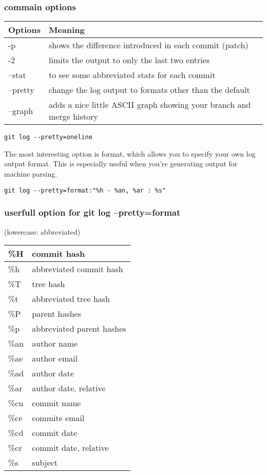 \documentclass[11pt]{article}
\begin{document}
\subsubsection{commain options}
\label{sec:org9db2588}
\begin{center}
\begin{tabular}{ll}
Options & Meaning\\
\hline
-p & shows the difference introduced in each commit (patch)\\
-2 & limits the output to only the last two entries\\
--stat & to see some abbreviated stats for each commit\\
--pretty & change the log output to formats other than the default\\
--graph & adds a nice little ASCII graph showing your branch and merge history\\
\end{tabular}
\end{center}

\begin{verbatim}
git log --pretty=oneline
\end{verbatim}


The most interesting option is format, which allows you to specify your own log output format. This is especially useful when you're generating output for machine parsing.\\
\begin{verbatim}
git log --pretty=format:"%h - %an, %ar : %s"
\end{verbatim}


\subsubsection{userfull option for git log --pretty=format}
\label{sec:orgaacbc63}
(lowercase: abbreviated)\\
\begin{center}
\begin{tabular}{|l|l|}
\hline
\%H & commit hash \\
\hline
\%h & abbreviated commit hash \\
\hline
\%T & tree hash \\
\hline
\%t & abbreviated tree hash \\
\hline
\%P & parent hashes \\
\hline
\%p & abbreviated parent hashes \\
\hline
\%an & author name \\
\hline
\%ae & author email \\
\hline
\%ad & author date \\
\hline
\%ar & author date, relative \\
\hline
\%cn & commit name \\
\hline
\%ce & commite email \\
\hline
\%cd & commit date \\
\hline
\%cr & commit date, relative \\
\hline
\%s & subject \\
\hline
\end{tabular}
\end{center}
\end{document}
